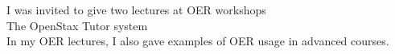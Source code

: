 \documentclass[../../../main.tex]{subfiles}
\begin{document}
\label{sec:oer_workshops}

I was invited to give two lectures at OER workshops 
\\
\vspace{0.15cm}
The OpenStax Tutor system
\\
\vspace{0.15cm}
In my OER lectures, I also gave examples of OER usage in advanced courses.
\end{document}
